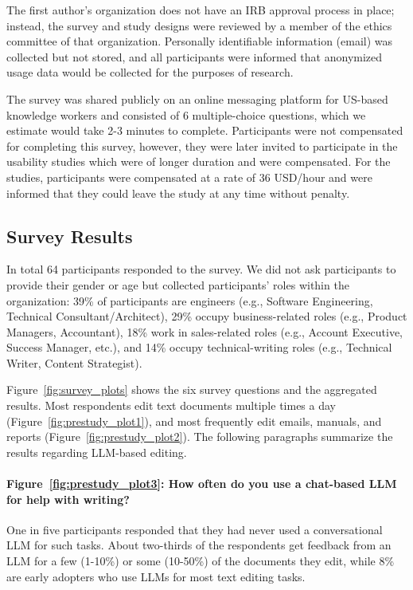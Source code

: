 \documentclass[manuscript]{acmart}
\begin{document}
The first author's organization does not have an IRB approval process in place; instead, the survey and study designs were reviewed by a member of the ethics committee of that organization. Personally identifiable information (email) was collected but not stored, and all participants were informed that anonymized usage data would be collected for the purposes of research. 

The survey was shared publicly on an online messaging platform for US-based knowledge workers and consisted of 6 multiple-choice questions, which we estimate would take 2-3 minutes to complete. Participants were not compensated for completing this survey, however, they were later invited to participate in the usability studies which were of longer duration and were compensated. For the studies, participants were compensated at a rate of 36 USD/hour and were informed that they could leave the study at any time without penalty.

\subsection{Survey Results}

In total 64 participants responded to the survey. We did not ask participants to provide their gender or age but collected participants' roles within the organization: 39\% of participants are engineers (e.g., Software Engineering, Technical Consultant/Architect), 29\% occupy business-related roles (e.g., Product Managers, Accountant), 18\% work in sales-related roles (e.g., Account Executive, Success Manager, etc.), and 14\% occupy technical-writing roles (e.g., Technical Writer, Content Strategist).

Figure~\ref{fig:survey_plots} shows the six survey questions and the aggregated results. Most respondents edit text documents multiple times a day (Figure~\ref{fig:prestudy_plot1}), and most frequently edit emails, manuals, and reports (Figure~\ref{fig:prestudy_plot2}). The following paragraphs summarize the results regarding LLM-based editing.

\paragraph{Figure~\ref{fig:prestudy_plot3}: How often do you use a chat-based LLM for help with writing?} One in five participants responded that they had never used a conversational LLM for such tasks. About two-thirds of the respondents get feedback from an LLM for a few (1-10\%) or some (10-50\%) of the documents they edit, while 8\% are early adopters who use LLMs for most text editing tasks.
\end{document}
